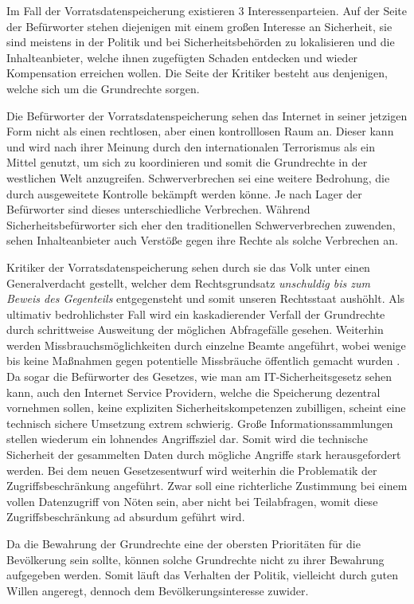 \documentclass[
	12pt,
	a4paper,
	BCOR10mm,
	DIV14,
	listof=totoc,
	bibliography=totoc,
	headsepline
]{scrreprt}
\begin{document}
Im Fall der Vorratsdatenspeicherung existieren 3 Interessenparteien.
Auf der Seite der Befürworter stehen diejenigen mit einem großen Interesse an Sicherheit, sie sind meistens in der Politik und bei Sicherheitsbehörden zu lokalisieren und die Inhalteanbieter, welche ihnen zugefügten Schaden entdecken und wieder Kompensation erreichen wollen.
Die Seite der Kritiker besteht aus denjenigen, welche sich um die Grundrechte sorgen.

Die Befürworter der Vorratsdatenspeicherung sehen das Internet in seiner jetzigen Form nicht als einen rechtlosen, aber einen kontrolllosen Raum an.
Dieser kann und wird nach ihrer Meinung durch den internationalen Terrorismus als ein Mittel genutzt, um sich zu koordinieren und somit die Grundrechte in der westlichen Welt anzugreifen.
Schwerverbrechen sei eine weitere Bedrohung, die durch ausgeweitete Kontrolle bekämpft werden könne.
Je nach Lager der Befürworter sind dieses unterschiedliche Verbrechen.
Während Sicherheitsbefürworter sich eher den traditionellen Schwerverbrechen zuwenden, sehen Inhalteanbieter auch Verstöße gegen ihre Rechte als solche Verbrechen an.

Kritiker der Vorratsdatenspeicherung sehen durch sie das Volk unter einen Generalverdacht gestellt, welcher dem Rechtsgrundsatz \textit{unschuldig bis zum Beweis des Gegenteils} entgegensteht und somit unseren Rechtsstaat aushöhlt.
Als ultimativ bedrohlichster Fall wird ein kaskadierender Verfall der Grundrechte durch schrittweise Ausweitung der möglichen Abfragefälle gesehen.
Weiterhin werden Missbrauchsmöglichkeiten durch einzelne Beamte angeführt, wobei wenige bis keine Maßnahmen gegen potentielle Missbräuche öffentlich gemacht wurden \cite{ct:vorratsdaten}.
Da sogar die Befürworter des Gesetzes, wie man am IT-Sicherheitsgesetz sehen kann, auch den Internet Service Providern, welche die Speicherung dezentral vornehmen sollen, keine expliziten Sicherheitskompetenzen zubilligen, scheint eine technisch sichere Umsetzung extrem schwierig.
Große Informationssammlungen stellen wiederum ein lohnendes Angriffsziel dar.
Somit wird die technische Sicherheit der gesammelten Daten durch mögliche Angriffe stark herausgefordert werden.
Bei dem neuen Gesetzesentwurf wird weiterhin die Problematik der Zugriffsbeschränkung angeführt.
Zwar soll eine richterliche Zustimmung bei einem vollen Datenzugriff von Nöten sein, aber nicht bei Teilabfragen, womit diese Zugriffsbeschränkung ad absurdum geführt wird.

Da die Bewahrung der Grundrechte eine der obersten Prioritäten für die Bevölkerung sein sollte, können solche Grundrechte nicht zu ihrer Bewahrung aufgegeben werden.
Somit läuft das Verhalten der Politik, vielleicht durch guten Willen angeregt, dennoch dem Bevölkerungsinteresse zuwider.
\end{document}
